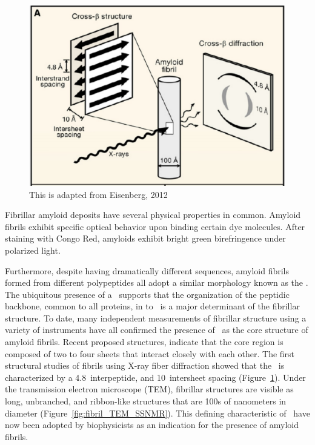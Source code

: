 \begin{figure}
  \centering
  \includegraphics[width=6in]{figures/introduction/fibril_structure_diffraction.pdf}
  \caption[Characteristic cross-$\beta$ spacings from X-ray fibre diffraction studies of amyloid fibrils]{This is adapted from Eisenberg, 2012}
  \label{fig:fibril_diffraction}
\end{figure}


Fibrillar amyloid deposits have several physical properties in common. Amyloid fibrils exhibit specific optical behavior upon binding certain dye molecules. After staining with Congo Red, amyloids exhibit bright green birefringence under polarized light. 

Furthermore, despite having dramatically different sequences, amyloid fibrils formed from different polypeptides all adopt a similar morphology known as the \crossbs. %
The ubiquitous presence of a \crossbs\ supports that the organization of the peptidic backbone, common to all proteins, in to \bsheets\ is a major determinant of the fibrillar structure. To date, many independent measurements of fibrillar structure using a variety of instruments have all confirmed the presence of \crossbs\ as the core structure of amyloid fibrils.  Recent proposed structures, indicate that the core region is composed of two to four sheets that interact closely with each other. The first structural studies of fibrils using X-ray fiber diffraction showed that the \crossbs\ is characterized by a 4.8\angstrom\ interpeptide, and 10\angstrom\ intersheet spacing (Figure~\ref{fig:fibril_diffraction}).  Under the transmission electron microscope (TEM), fibrillar structures are visible as long, unbranched, and ribbon-like structures that are 100s of nanometers in diameter (Figure~\ref{fig:fibril_TEM_SSNMR}). This defining characteristic of \crossb\ have now been adopted by biophysicists as an indication for the presence of amyloid fibrils.

